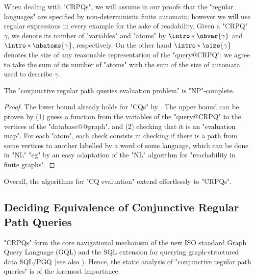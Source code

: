 
When dealing with "CRPQs", we will assume in our proofs that the "regular languages"
are specified by non-deterministic finite automata; however we will use
regular expressions in every example for the sake of readability.
Given a "CRPQ" $\gamma$, we denote its number of "variables"
and "atoms" by \AP$\intro*\nbvar{\gamma}$ and $\intro*\nbatoms{\gamma}$, respectively.
On the other hand $\intro*\size{\gamma}$ denotes the size of any reasonable representation
of the "query@CRPQ": we agree to take the sum of its number of "atoms" with
the sum of the size of automata used to describe $\gamma$.

\begin{proposition}
    The "conjunctive regular path queries evaluation problem" is "NP"-complete.
\end{proposition}

\begin{proof}
    The lower bound already holds for "CQs" by .
    The upper bound can be proven by (1) guess a function from the variables
    of the "query@CRPQ" to the vertices of the "database@@graph",
    and (2) checking that it is an "evaluation map". 
    For each "atom", each check consists in checking if there is a
    path from some vertices to another labelled by a word of some language,
    which can be done in "NL" "eg" by an easy
    adaptation of the "NL" algorithm for "reachability in finite graphs".
\end{proof}


Overall, the algorithms for "CQ evaluation" extend effortlessly to "CRPQs". 

\subsection{Deciding Equivalence of Conjunctive Regular Path Queries}

"CRPQs" form the core navigational mechanism of the new ISO standard Graph Query Language (GQL) \cite{ISO2024GQL} and the SQL extension for querying graph-structured data SQL/PGQ \cite{ISO2023PGQ} (see also \cite{FrancisEtal2023GQL,FrancisEtal2023GPC}).
Hence, the static analysis of "conjunctive regular path queries" is of the foremost
importance.

